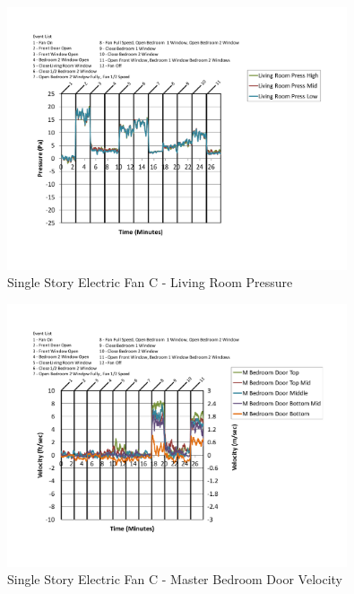 \documentclass{article}
\begin{document}
\begin{appendices}
	\begin{figure}[H]
		\centering
		\includegraphics[height=3.05in,trim=0.67in 1.1in 0.67in 0.8in,clip=true]{0_Images/Results_Charts/ColdFlow/Single_Story/Electric/C/Living_Room_Pressure.pdf}
		\caption{Single Story Electric Fan C - Living Room Pressure}
	\end{figure}
 

	\begin{figure}[H]
		\centering
		\includegraphics[height=3.05in,trim=0.67in 1.1in 0.67in 0.8in,clip=true]{0_Images/Results_Charts/ColdFlow/Single_Story/Electric/C/Master_Bedroom_Door_Velocity.pdf}
		\caption{Single Story Electric Fan C - Master Bedroom Door Velocity}
	\end{figure}
 
	\clearpage


\end{appendices}
\end{document}
